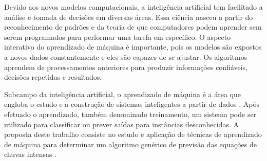 Devido aos novos modelos computacionais, a inteligência artificial tem facilitado a análise e tomada de decisões em diversas áreas. Essa ciência nasceu a partir do reconhecimento de padrões e da teoria de que computadores podem aprender sem serem programados para performar uma tarefa em específico. O aspecto interativo do aprendizado de máquina é importante, pois os modelos são expostos a novos dados constantemente e eles são capazes de se ajustar. Os algoritmos aprendem de processamentos anteriores para produzir informações confiáveis, decisões repetidas e resultados.

Subcampo da inteligência artificial, o aprendizado de máquina é a área que engloba o estudo e a construção de sistemas inteligentes a partir de dados \cite{ML}. Após efetuado o aprendizado, também denominado treinamento, um sistema pode ser utilizado para classificar ou prever saídas para instâncias desconhecidas. A proposta deste trabalho consiste no estudo e aplicação de técnicas de aprendizado de máquina para determinar um algoritmo genérico de previsão das equações de chuvas intensas \cite{big-data}.

